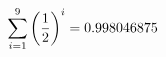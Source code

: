 \documentclass[preview]{standalone}
\begin{document}
\begin{align*}
\sum_{i=1}^{ 9 } \left({ 1 } \over {2} \right)^i = { 0.998046875 }
\end{align*}
\end{document}
